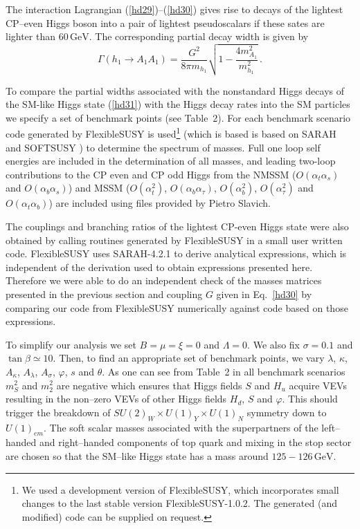 \documentclass[12pt,a4paper]{article}
\def\at{\alpha_t}
\def\ab{\alpha_b}
\def\as{\alpha_s}
\def\atau{\alpha_{\tau}}
\def\oatab{O(\at\ab)}
\def\oatas{O(\at\as)}
\def\oabas{O(\ab\as)}
\def\oatq{O(\at^2)}
\def\oabq{O(\ab^2)}
\def\oatauq{O(\atau^2)}
\def\oabatau{O(\ab \atau)}
\begin{document}
The interaction Lagrangian (\ref{hd29})--(\ref{hd30}) gives rise to decays of the lightest CP--even Higgs boson into
a pair of lightest pseudoscalars if these sates are lighter than $60\,\mbox{GeV}$. The corresponding partial decay width is given by
\begin{equation}
\Gamma(h_1\to A_1 A_1)=\dfrac{G^2}{8\pi m_{h_1}}\sqrt{1-\dfrac{4 m_{A_1}^2}{m_{h_1}^2}}\,.
\label{hd31}
\end{equation}

To compare the partial widths associated with the nonstandard Higgs decays of the SM-like Higgs state (\ref{hd31})
with the Higgs decay rates into the SM particles we specify a set of benchmark points (see Table~2).  For each benchmark scenario code generated by FlexibleSUSY
\cite{Athron:2014yba} is used\footnote{We used a development version of FlexibleSUSY, which incorporates small changes to the last stable version FlexibleSUSY-1.0.2.  The generated (and modified) code can be supplied on request.} (which is based is based on SARAH \cite{Staub:2010ty,Staub:2009bi,Staub:2010jh,Staub:2012pb,Staub:2013tta} and SOFTSUSY \cite{Allanach:2001kg,Allanach:2013kza}) to determine the spectrum of masses.    Full one loop self energies are included in the determination of all masses, and leading two-loop contributions to the CP even and CP odd Higgs from the NMSSM ($\oatas$ and $\oabas$) \cite{Degrassi:2009yq} and MSSM ($\oatq$, $\oabatau$, $\oabq$, $\oatauq$ and $\oatab$) \cite{Degrassi:2001yf,Brignole:2001jy,Dedes:2002dy,Brignole:2002bz,Dedes:2003km} are included using files provided by Pietro Slavich. 

The couplings and branching ratios of the lightest CP-even Higgs state were also obtained by calling routines generated by FlexibleSUSY in a small user written code.  FlexibleSUSY uses SARAH-4.2.1 \cite{Staub:2010ty,Staub:2009bi,Staub:2010jh,Staub:2012pb,Staub:2013tta} to derive analytical expressions, which is independent of the derivation used to obtain expressions presented here. Therefore we were able to do an independent check of the masses matrices presented in the previous section and coupling $G$ given in Eq.~\ref{hd30} by comparing our code from FlexibleSUSY numerically against code based on those expressions.  

To simplify our analysis we set $B=\mu=\xi=0$ and $\Lambda=0$. We also fix $\sigma=0.1$ and $\tan\beta\simeq 10$.
Then, to find an appropriate set of benchmark points, we vary $\lambda$, $\kappa$, $A_{\kappa}$,
$A_{\lambda}$, $A_{\sigma}$, $\varphi$, $s$ and $\theta$. As one can see from Table~2 in all benchmark scenarios
$m_{S}^2$ and  $m_2^2$ are negative which ensures that Higgs fields $S$ and $H_u$ acquire VEVs
resulting in the non--zero VEVs of other Higgs fields $H_d$, $S$ and $\varphi$. This should trigger the breakdown
of $SU(2)_W\times U(1)_Y\times U(1)_{N}$ symmetry down to $U(1)_{em}$. The soft scalar masses associated with
the superpartners of the left--handed and right--handed components of top quark and mixing in the stop sector are chosen
so that the SM--like Higgs state has a mass around $125-126\,\mbox{GeV}$.
\end{document}
